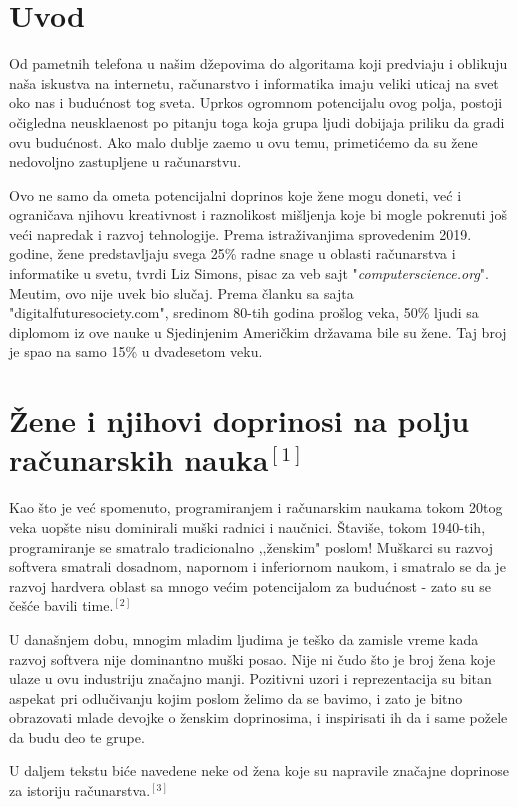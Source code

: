 \documentclass[12pt]{article}
\begin{document}

\tableofcontents

\newpage

\section{Uvod}
\begin{text}
Od pametnih telefona u našim džepovima do algoritama koji predvi\dj aju i oblikuju naša iskustva na internetu, 
računarstvo i informatika imaju veliki uticaj na svet oko nas i budućnost tog sveta.
Uprkos ogromnom potencijalu ovog polja, postoji očigledna neuskla\dj enost po pitanju toga koja grupa ljudi dobijaja priliku da gradi ovu budućnost. Ako malo dublje za\dj emo u ovu temu, primetićemo da su žene nedovoljno zastupljene u računarstvu.

Ovo ne samo da ometa potencijalni doprinos koje žene mogu doneti, već i ograničava njihovu kreativnost i raznolikost mišljenja koje bi mogle pokrenuti još veći napredak i razvoj tehnologije.
Prema istraživanjima sprovedenim 2019. godine, žene predstavljaju svega 25\% radne snage u oblasti računarstva i informatike u svetu, tvrdi Liz Simons, pisac za veb sajt "\textit{computerscience.org}". Me\dj utim, ovo nije uvek bio slučaj. Prema članku sa sajta "digitalfuturesociety.com", sredinom 80-tih godina prošlog veka, 50\% ljudi sa diplomom iz ove nauke u Sjedinjenim Američkim državama bile su žene. Taj broj je spao na samo 15\% u dvadesetom veku.
\end{text}

\newpage

\section{Žene i njihovi doprinosi na polju računarskih nauka$^{[1]}$}
\begin{text}
Kao što je već spomenuto, programiranjem i računarskim naukama tokom 20tog veka uopšte nisu dominirali muški radnici i naučnici. Štaviše, tokom 1940-tih, programiranje se smatralo tradicionalno ,,ženskim" poslom! Muškarci su razvoj softvera smatrali dosadnom, napornom i inferiornom naukom, i smatralo se da je razvoj hardvera oblast sa mnogo većim potencijalom za budućnost - zato su se češće bavili time.$^{[2]}$

U današnjem dobu, mnogim mladim ljudima je teško da zamisle vreme kada razvoj softvera nije dominantno muški posao. Nije ni čudo što je broj žena koje ulaze u ovu industriju značajno manji. Pozitivni uzori i reprezentacija su bitan aspekat pri odlučivanju kojim poslom želimo da se bavimo, i zato je bitno obrazovati mlade devojke o ženskim doprinosima, i inspirisati ih da i same požele da budu deo te grupe. 

U daljem tekstu biće navedene neke od žena koje su napravile značajne doprinose za istoriju računarstva.$^{[3]}$
\end{text}
\end{document}
